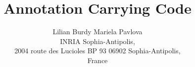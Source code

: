 \documentclass[pagenumbers]{ieee}
\begin{document}
\title{ Annotation Carrying Code }
\author{Lilian Burdy  Mariela Pavlova\\
INRIA Sophia-Antipolis,\\ 2004 route des Lucioles BP 93
06902 Sophia-Antipolis,\\  France}


\maketitle
\thispagestyle{empty}
\begin{abstract}

\end{abstract}








%







\end{document}
